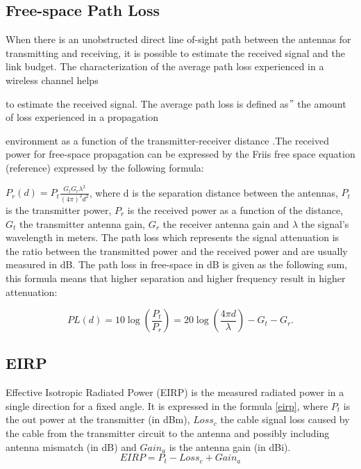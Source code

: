 

\subsection{Free-space Path Loss}

When there is an unobstructed direct line of-sight path between the antennas for transmitting and receiving, it is possible to estimate the received signal and the link budget. The characterization of the average path loss experienced in a wireless channel helps

to estimate the received signal. The average path loss is defined as$"$  the amount of loss experienced in a propagation

environment as a function of the transmitter-receiver distance \cite{schantz}.The received power for free-space propagation can be expressed by the Friis free space equation (reference) expressed by the following formula:

$P_{r} \left( d \right) = P_{t}\frac{G_{t}G_{r} \lambda ^{2}}{ \left( 4 \pi  \right) ^{2}d^{2}} $, where d is the separation distance between the antennas,  $P_{t}$ is the transmitter power, $P_{r}$ is the received power as a function of the distance, $G_{t}$ the transmitter antenna gain, $G_{r}$ the receiver antenna gain and $\lambda$ the signal's wavelength in meters.
The path loss which represents the signal attenuation is the ratio between the transmitted power and the received power and are usually measured in dB. The path loss in free-space in dB is given as the following sum, this formula means that higher separation and higher frequency result in higher attenuation:

\begin{equation} 
PL \left( d \right) =10\log(\frac{P_{t}}{P_{r}})  =20\log \left( \frac{4 \pi d}{ \lambda } \right) -G_{t}-G_{r}.
\end{equation}

\subsection{EIRP}

Effective Isotropic Radiated Power (EIRP) is the measured radiated power in a single direction for a fixed angle. It is expressed in the formula \ref{eirp}, where $P_{t}$ is the out power at the transmitter (in dBm), $Loss_{c}$ the cable signal loss caused by the cable from the transmitter circuit to the antenna and possibly including antenna mismatch (in dB) and $Gain_{a}$ is the antenna gain (in dBi).
\begin{equation}
EIRP= P_{t} - Loss_{c}+  Gain_{a} \label{eirp}
\end{equation}
  


